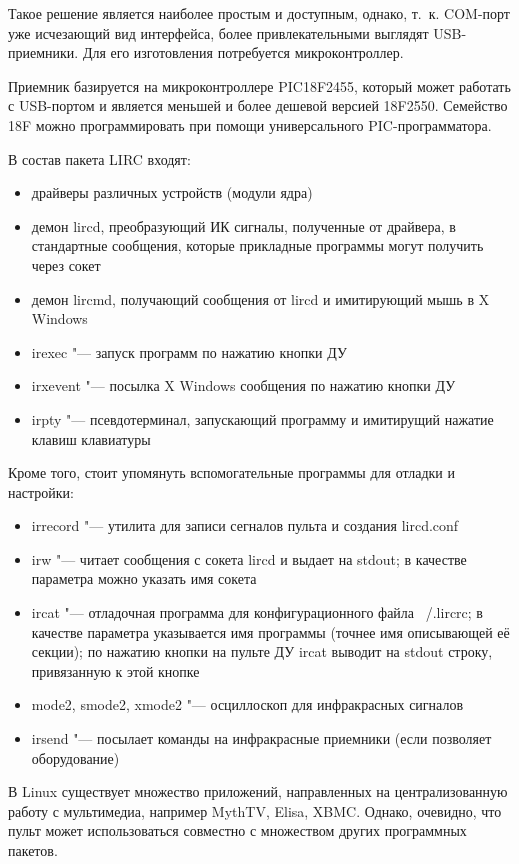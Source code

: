 \documentclass[10pt, a5paper]{article}
\begin{document}
Такое решение является наиболее простым и доступным, однако, т.~к. COM-порт 
уже исчезающий вид интерфейса, более привлекательными выглядят
USB-приемники. Для его изготовления потребуется микроконтроллер.

Приемник базируется на микроконтроллере PIC18F2455, который может
работать с USB-портом и является меньшей и более дешевой версией
18F2550. Семейство 18F можно программировать при помощи универсального
PIC-программатора.

В состав пакета LIRC входят:
\begin{itemize}
	\item драйверы различных устройств (модули ядра)
	\item демон lircd, преобразующий ИК сигналы, полученные от драйвера, в стандартные сообщения, которые прикладные программы могут получить
через сокет 
\item демон lircmd, получающий сообщения от lircd и имитирующий мышь в X Windows
\item irexec "--- запуск программ по нажатию кнопки ДУ
\item irxevent "--- посылка X Windows сообщения по нажатию кнопки ДУ
\item irpty "--- псевдотерминал, запускающий программу и имитирущий нажатие клавиш клавиатуры
\end{itemize}
Кроме того, стоит упомянуть вспомогательные программы для отладки и настройки:
\begin{itemize}
	\item irrecord "--- утилита для записи сегналов пульта и создания \linebreak lircd.conf
	\item irw "--- читает сообщения с сокета lircd и выдает на stdout; в качестве параметра можно указать имя сокета
	\item ircat "--- отладочная программа для конфигурационного файла ~/.lircrc; в качестве параметра указывается имя программы (точнее имя описывающей
её секции); по нажатию кнопки на пульте ДУ ircat выводит на stdout строку, привязанную к этой кнопке
\item mode2, smode2, xmode2 "--- осциллоскоп для инфракрасных сигналов
\item irsend "--- посылает команды на инфракрасные приемники (если позволяет оборудование)
\end{itemize}
В Linux существует множество приложений, направленных на централизованную работу с мультимедиа, например MythTV, Elisa,
XBMC. Однако, очевидно, что пульт может использоваться совместно с множеством других программных пакетов.
\end{document}
